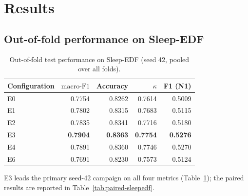 \documentclass[11pt,a4paper]{article}
\newcommand{\mf}{\ensuremath{\mathrm{macro\text{-}F1}}}
\begin{document}
\section{Results}

\subsection{Out-of-fold performance on Sleep-EDF}

\begin{table}[t]
\centering
\caption{Out-of-fold test performance on Sleep-EDF (seed 42, pooled over all folds).}
\label{tab:sleepedf-performance}
\small
\begin{tabular}{lrrrr}
\toprule
\textbf{Configuration} & \textbf{\mf} & \textbf{Accuracy} & \textbf{$\kappa$} & \textbf{F1 (N1)} \\
\midrule
E0 & 0.7754 & 0.8262 & 0.7614 & 0.5009 \\
E1 & 0.7802 & 0.8315 & 0.7683 & 0.5115 \\
E2 & 0.7835 & 0.8341 & 0.7716 & 0.5180 \\
E3 & \textbf{0.7904} & \textbf{0.8363} & \textbf{0.7754} & \textbf{0.5276} \\
E4 & 0.7891 & 0.8360 & 0.7746 & 0.5270 \\
E6 & 0.7691 & 0.8230 & 0.7573 & 0.5124 \\
\bottomrule
\end{tabular}
\end{table}

E3 leads the primary seed-42 campaign on all four metrics (Table~\ref{tab:sleepedf-performance}); the
paired results are reported in Table~\ref{tab:paired-sleepedf}.
\end{document}
